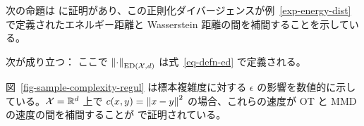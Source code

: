 次の命題は \citep{ramdas2017wasserstein} に証明があり、この正則化ダイバージェンスが例~\ref{exp-energy-dist} で定義されたエネルギー距離と Wasserstein 距離の間を補間することを示している。

\begin{prop}
	次が成り立つ：
	ここで $\left\| \cdot \right\|_{\text{ED}(\mathcal{X},d)}$ は式~\eqref{eq-defn-ed} で定義される。
\end{prop}

図~\ref{fig-sample-complexity-regul} は標本複雑度に対する $\epsilon$ の影響を数値的に示している。$\mathcal{X}=\mathbb{R}^d$ 上で $c(x,y)=\left\| x-y \right\|^2$ の場合、これらの速度が OT と MMD の速度の間を補間することが \cite{genevay2018sample} で証明されている。
